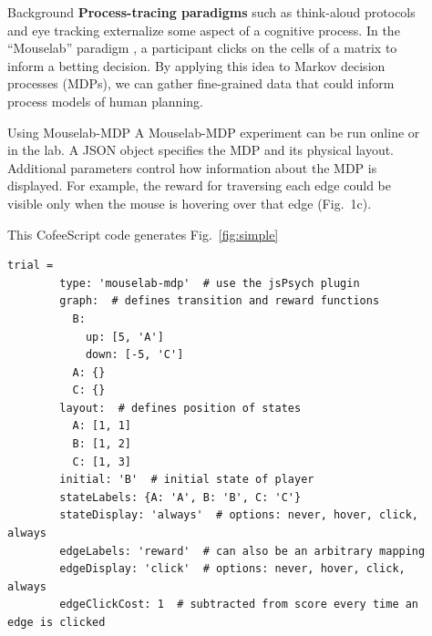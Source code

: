 \documentclass[final]{beamer}
\newlength{\sepwid}
\newlength{\onecolwid}
\newlength{\twocolwid}
\begin{document}
\begin{frame}[t, fragile]
\begin{columns}[t]
\begin{column}{\onecolwid}
\begin{block}{Background}
    \textbf{Process-tracing paradigms} such as think-aloud protocols and eye tracking externalize some aspect of a cognitive process.
    In the ``Mouselab'' paradigm \cite{Payne1988}, a participant clicks on the cells of a matrix to inform a betting decision.
    By applying this idea to Markov decision processes (MDPs), we can gather fine-grained data that could inform process models of human planning.

  \end{block}

  \begin{block}{Using Mouselab-MDP}\label{usage}
    A Mouselab-MDP experiment can be run online or in the lab.
    A JSON object specifies the MDP and its physical layout.
    Additional parameters control how information about the MDP is displayed.
    For example, the reward for traversing each edge could be visible only when the mouse is hovering over that edge (Fig.~1c).

    This CofeeScript code generates Fig.~\ref{fig:simple}
    \begin{Verbatim}[fontsize=\tiny]
      trial =
        type: 'mouselab-mdp'  # use the jsPsych plugin
        graph:  # defines transition and reward functions
          B:
            up: [5, 'A']
            down: [-5, 'C']
          A: {}
          C: {}
        layout:  # defines position of states
          A: [1, 1]
          B: [1, 2]
          C: [1, 3]
        initial: 'B'  # initial state of player
        stateLabels: {A: 'A', B: 'B', C: 'C'}
        stateDisplay: 'always'  # options: never, hover, click, always
        edgeLabels: 'reward'  # can also be an arbitrary mapping
        edgeDisplay: 'click'  # options: never, hover, click, always
        edgeClickCost: 1  # subtracted from score every time an edge is clicked
    \end{Verbatim}
  \end{block}

\end{column} %

\begin{column}{\sepwid}\end{column} %
\begin{column}{\twocolwid} %


\end{column}
\end{columns}
\end{frame}
\end{document}
